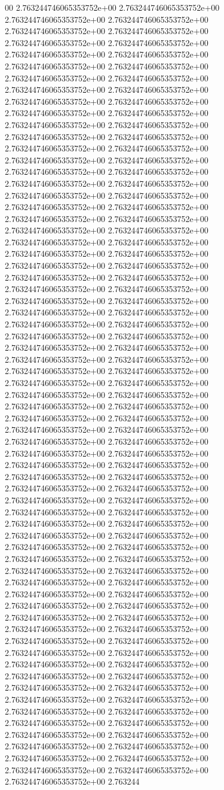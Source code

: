 00	2.763244746065353752e+00	2.763244746065353752e+00	2.763244746065353752e+00	2.763244746065353752e+00	2.763244746065353752e+00	2.763244746065353752e+00	2.763244746065353752e+00	2.763244746065353752e+00	2.763244746065353752e+00	2.763244746065353752e+00	2.763244746065353752e+00	2.763244746065353752e+00	2.763244746065353752e+00	2.763244746065353752e+00	2.763244746065353752e+00	2.763244746065353752e+00	2.763244746065353752e+00	2.763244746065353752e+00	2.763244746065353752e+00	2.763244746065353752e+00	2.763244746065353752e+00	2.763244746065353752e+00	2.763244746065353752e+00	2.763244746065353752e+00	2.763244746065353752e+00	2.763244746065353752e+00	2.763244746065353752e+00	2.763244746065353752e+00	2.763244746065353752e+00	2.763244746065353752e+00	2.763244746065353752e+00	2.763244746065353752e+00	2.763244746065353752e+00	2.763244746065353752e+00	2.763244746065353752e+00	2.763244746065353752e+00	2.763244746065353752e+00	2.763244746065353752e+00	2.763244746065353752e+00	2.763244746065353752e+00	2.763244746065353752e+00	2.763244746065353752e+00	2.763244746065353752e+00	2.763244746065353752e+00	2.763244746065353752e+00	2.763244746065353752e+00	2.763244746065353752e+00	2.763244746065353752e+00	2.763244746065353752e+00	2.763244746065353752e+00	2.763244746065353752e+00	2.763244746065353752e+00	2.763244746065353752e+00	2.763244746065353752e+00	2.763244746065353752e+00	2.763244746065353752e+00	2.763244746065353752e+00	2.763244746065353752e+00	2.763244746065353752e+00	2.763244746065353752e+00	2.763244746065353752e+00	2.763244746065353752e+00	2.763244746065353752e+00	2.763244746065353752e+00	2.763244746065353752e+00	2.763244746065353752e+00	2.763244746065353752e+00	2.763244746065353752e+00	2.763244746065353752e+00	2.763244746065353752e+00	2.763244746065353752e+00	2.763244746065353752e+00	2.763244746065353752e+00	2.763244746065353752e+00	2.763244746065353752e+00	2.763244746065353752e+00	2.763244746065353752e+00	2.763244746065353752e+00	2.763244746065353752e+00	2.763244746065353752e+00	2.763244746065353752e+00	2.763244746065353752e+00	2.763244746065353752e+00	2.763244746065353752e+00	2.763244746065353752e+00	2.763244746065353752e+00	2.763244746065353752e+00	2.763244746065353752e+00	2.763244746065353752e+00	2.763244746065353752e+00	2.763244746065353752e+00	2.763244746065353752e+00	2.763244746065353752e+00	2.763244746065353752e+00	2.763244746065353752e+00	2.763244746065353752e+00	2.763244746065353752e+00	2.763244746065353752e+00	2.763244746065353752e+00	2.763244746065353752e+00	2.763244746065353752e+00	2.763244746065353752e+00	2.763244746065353752e+00	2.763244746065353752e+00	2.763244746065353752e+00	2.763244746065353752e+00	2.763244746065353752e+00	2.763244746065353752e+00	2.763244746065353752e+00	2.763244746065353752e+00	2.763244746065353752e+00	2.763244746065353752e+00	2.763244746065353752e+00	2.763244746065353752e+00	2.763244746065353752e+00	2.763244746065353752e+00	2.763244746065353752e+00	2.763244746065353752e+00	2.763244746065353752e+00	2.763244746065353752e+00	2.763244746065353752e+00	2.763244746065353752e+00	2.763244746065353752e+00	2.763244746065353752e+00	2.763244746065353752e+00	2.763244746065353752e+00	2.763244746065353752e+00	2.763244746065353752e+00	2.763244746065353752e+00	2.763244746065353752e+00	2.763244746065353752e+00	2.763244746065353752e+00	2.763244746065353752e+00	2.763244